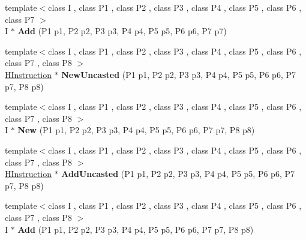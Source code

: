 \begin{DoxyCompactItemize}
\item 
\hypertarget{classv8_1_1internal_1_1_h_graph_builder_ac2839044c0a2fe5f7bd848c34a6ab991}{}{\footnotesize template$<$class I , class P1 , class P2 , class P3 , class P4 , class P5 , class P6 , class P7 $>$ }\\I $\ast$ {\bfseries Add} (P1 p1, P2 p2, P3 p3, P4 p4, P5 p5, P6 p6, P7 p7)\label{classv8_1_1internal_1_1_h_graph_builder_ac2839044c0a2fe5f7bd848c34a6ab991}

\item 
\hypertarget{classv8_1_1internal_1_1_h_graph_builder_a4cff9fb7728d794b326cc12ec3ca084c}{}{\footnotesize template$<$class I , class P1 , class P2 , class P3 , class P4 , class P5 , class P6 , class P7 , class P8 $>$ }\\\hyperlink{classv8_1_1internal_1_1_h_instruction}{H\+Instruction} $\ast$ {\bfseries New\+Uncasted} (P1 p1, P2 p2, P3 p3, P4 p4, P5 p5, P6 p6, P7 p7, P8 p8)\label{classv8_1_1internal_1_1_h_graph_builder_a4cff9fb7728d794b326cc12ec3ca084c}

\item 
\hypertarget{classv8_1_1internal_1_1_h_graph_builder_addca06fd25b3481255bc25e2adc1358c}{}{\footnotesize template$<$class I , class P1 , class P2 , class P3 , class P4 , class P5 , class P6 , class P7 , class P8 $>$ }\\I $\ast$ {\bfseries New} (P1 p1, P2 p2, P3 p3, P4 p4, P5 p5, P6 p6, P7 p7, P8 p8)\label{classv8_1_1internal_1_1_h_graph_builder_addca06fd25b3481255bc25e2adc1358c}

\item 
\hypertarget{classv8_1_1internal_1_1_h_graph_builder_aeaea143dd1e7af96ea1fc5dea0ebdf76}{}{\footnotesize template$<$class I , class P1 , class P2 , class P3 , class P4 , class P5 , class P6 , class P7 , class P8 $>$ }\\\hyperlink{classv8_1_1internal_1_1_h_instruction}{H\+Instruction} $\ast$ {\bfseries Add\+Uncasted} (P1 p1, P2 p2, P3 p3, P4 p4, P5 p5, P6 p6, P7 p7, P8 p8)\label{classv8_1_1internal_1_1_h_graph_builder_aeaea143dd1e7af96ea1fc5dea0ebdf76}

\item 
\hypertarget{classv8_1_1internal_1_1_h_graph_builder_a4a93858e92e98389a959d17e23eeb973}{}{\footnotesize template$<$class I , class P1 , class P2 , class P3 , class P4 , class P5 , class P6 , class P7 , class P8 $>$ }\\I $\ast$ {\bfseries Add} (P1 p1, P2 p2, P3 p3, P4 p4, P5 p5, P6 p6, P7 p7, P8 p8)\label{classv8_1_1internal_1_1_h_graph_builder_a4a93858e92e98389a959d17e23eeb973}


\end{DoxyCompactItemize}
